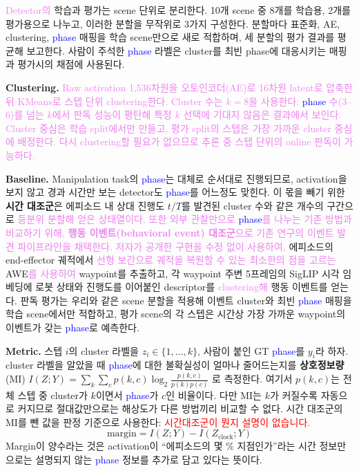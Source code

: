 \documentclass[a4paper,twocolumn,9pt]{extarticle}
\newcommand{\term}[1]{\textcolor{blue}{#1}}  %
\newcommand{\rev}[1]{\textcolor{violet}{#1}}  %
\begin{document}
\rev{Detector의} 학습과 평가는 scene 단위로 분리한다. 10개 scene 중 8개를 학습용, 2개를 평가용으로 나누고, 이러한 분할을 무작위로 3가지 구성한다. 분할마다 표준화, AE, clustering, \term{phase} 매핑을 학습 scene만으로 새로 적합하며, 세 분할의 평가 결과를 평균해 보고한다.  사람이 주석한 \term{phase} 라벨은 cluster를 최빈 phase에 대응시키는 매핑과 평가시의 채점에 사용된다.

\textbf{Clustering.} \rev{Raw activation 1{,}536차원을 오토인코더(AE)로 16차원 latent로 압축한 뒤 KMeans로 스텝 단위 clustering한다. \rev{Cluster 수는 $k=8$을 사용한다. \term{phase} 수(3--6)를 넘는 $k$에서 판독 성능이 평탄해 특정 $k$ 선택에 기대지 않음은 결과에서 보인다.} Cluster 중심은 학습 split에서만 만들고, 평가 split의 스텝은 가장 가까운 cluster 중심에 배정한다. \rev{다시 clustering할 필요가 없으므로} 추론 중 스텝 단위의 online 판독이 가능하다.}

\textbf{Baseline.} Manipulation task의 \term{phase}는 대체로 순서대로 진행되므로, activation을 보지 않고 경과 시간만 보는 detector도 \term{phase}를 어느정도 맞힌다. 이 몫을 빼기 위한 \textbf{시간 대조군}은 에피소드 내 상대 진행도 $t/T$를 발견된 cluster
수와 같은 개수의 구간으로 \rev{등분위 분할해 얻은 상태열이다.} \rev{또한 외부 관찰만으로 \term{phase}를 나누는 기존 방법과 비교하기 위해, \textbf{행동 이벤트(behavioral event) 대조군}으로 기존 연구\cite{egsae}의 이벤트 발견 파이프라인을 채택한다. 저자가 공개한 구현을 수정 없이 사용하여,} 에피소드의 end-effector 궤적에서 \rev{선형 보간으로 궤적을 복원할 수 있는 최소한의 점을 고르는} AWE\cite{awe}\rev{를 사용하여} waypoint를 추출하고, 각 waypoint 주변
5프레임의 SigLIP\cite{siglip} 시각 임베딩에 로봇 상태와 진행도를 이어붙인 descriptor를 \rev{clustering해}
행동 이벤트를 얻는다. 판독 평가는 우리와 같은 scene 분할을 적용해 이벤트 cluster와 최빈
\term{phase} 매핑을 학습 scene에서만 적합하고, 평가 scene의 각 스텝은 시간상 가장 가까운
waypoint의 이벤트가 갖는 \term{phase}로 예측한다.

\textbf{Metric.} 스텝 $i$의 cluster 라벨을 $z_i \in \{1,\dots,k\}$, 사람이 붙인 GT
\term{phase}를 $y_i$라 하자. cluster 라벨을 알았을 때 \term{phase}에 대한 불확실성이 얼마나 줄어드는지를
\textbf{상호정보량}(MI) $I(Z;Y)=\sum_{k}\sum_{c} p(k,c)\log_2\frac{p(k,c)}{p(k)p(c)}$ 로 측정한다. 여기서 $p(k,c)$는 전체 스텝 중 cluster가 $k$이면서 \term{phase}가 $c$인 비율이다. 다만 MI는 $k$가 커질수록
자동으로 커지므로 절대값만으로는 해상도가 다른 방법끼리 비교할 수 없다. 시간 대조군의 MI를 뺀 값을 판정 기준으로 사용한다:
\textcolor{red}{시간대조군이 뭔지 설명이 없습니다.}
\begin{equation}
\mathrm{margin} = I(Z;Y) - I(Z_{\mathrm{clock}};Y)
\label{eq:margin}
\end{equation}
%
Margin이 양수라는 것은 activation이 ``에피소드의 몇 \% 지점인가''라는 시간 정보만으로는
설명되지 않는 \term{phase} 정보를 추가로 담고 있다는 뜻이다.
\end{document}
